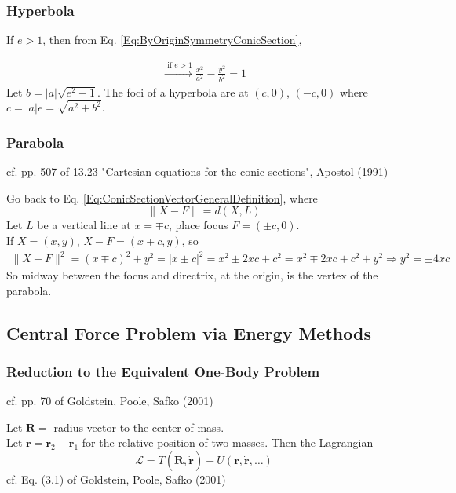\documentclass[10pt]{amsart}
\begin{document}
\begin{multicols*}{2}
\subsubsection{Hyperbola}

If $e > 1$, then from Eq. \ref{Eq:ByOriginSymmetryConicSection},

\[
\begin{gathered}
\xrightarrow{ \text{ if } e > 1 } \frac{x^2 }{ a^2 } - \frac{y^2}{b^2} = 1
\end{gathered}
\]
Let $b = |a| \sqrt{ e^2 - 1}$. The foci of a hyperbola are at $(c,0)$, $(-c,0)$ where $c= |a| e = \sqrt{ a^2 + b^2}$. 

\subsubsection{Parabola}

cf. pp. 507 of  13.23 "Cartesian equations for the conic sections", Apostol (1991) \cite{Apos1991}

Go back to Eq. \ref{Eq:ConicSectionVectorGeneralDefinition}, where
\[
\| X - F \| = d(X, L)
\]
Let $L$ be a vertical line at $x = \mp c$, place focus $F = (\pm c, 0)$. \\
If $X = (x,y)$, $X-F = (x \mp c, y)$, so 
\[
\begin{gathered}
\| X- F \|^2 = (x \mp c)^2 + y^2 = | x \pm c|^2 = x^2 \pm 2xc + c^2 = x^2 \mp 2xc + c^2 + y^2
\Longrightarrow y^2 = \pm 4xc
\end{gathered}
\]
So midway between the focus and directrix, at the origin, is the vertex of the parabola.

\subsection{Central Force Problem via Energy Methods}

\subsubsection{Reduction to the Equivalent One-Body Problem}

cf. pp. 70 of Goldstein, Poole, Safko (2001) \cite{GPS2001}

Let $\mathbf{R} = $ radius vector to the center of mass. \\

Let $\mathbf{r} = \mathbf{r}_2 - \mathbf{r}_1$ for the relative position of two masses. Then the Lagrangian
\begin{equation}
\mathcal{L} = T(\dot{\mathbf{R}}, \dot{ \mathbf{r}} ) - U (\mathbf{r}, \dot{\mathbf{r}}, \dots )
\end{equation}
cf. Eq. (3.1) of Goldstein, Poole, Safko (2001) \cite{GPS2001}


\end{multicols*}
\end{document}
